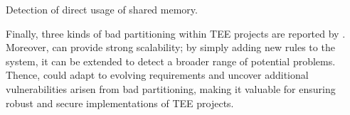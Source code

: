 \begin{algorithm}[t]
\caption{Detection of direct usage of shared memory.}
\label{algo:bp3}
\end{algorithm}

Finally, three kinds of bad partitioning within TEE projects are reported by \ccSysName.
Moreover, \ccSysName can provide strong scalability; by simply adding new rules to the system, it can be extended to detect a broader range of potential problems.
Thence, \ccSysName could adapt to evolving requirements and uncover additional vulnerabilities arisen from bad partitioning, making it valuable for ensuring robust and secure implementations of TEE projects.
